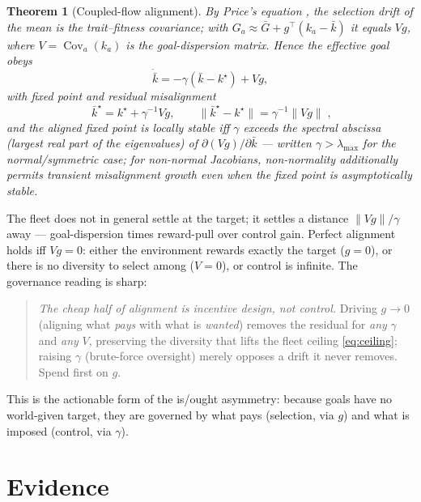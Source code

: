 \documentclass[11pt]{article}
\theoremstyle{plain}
\newtheorem{theorem}{Theorem}
\theoremstyle{definition}
\theoremstyle{remark}
\DeclareMathOperator{\Cov}{Cov}
\begin{document}
\begin{theorem}[Coupled-flow alignment]\label{thm:align}
By Price's equation \citep{price1970}, the selection drift of the mean is the trait--fitness covariance; with
$G_a\approx \bar G+g^\top(k_a-\bar k)$ it equals $Vg$, where $V=\Cov_a(k_a)$ is the goal-dispersion matrix.
Hence the effective goal obeys
\begin{equation}
\dot{\bar k}=-\gamma(\bar k-k^\star)+Vg,
\end{equation}
with fixed point and residual misalignment
\begin{equation}
\boxed{\;\bar k^\star=k^\star+\gamma^{-1}Vg,\qquad \|\bar k^\star-k^\star\|=\gamma^{-1}\|Vg\|\;,}
\end{equation}
and the aligned fixed point is locally stable iff $\gamma$ exceeds the spectral abscissa (largest real part of
the eigenvalues) of $\partial(Vg)/\partial\bar k$ --- written $\gamma>\lambda_{\max}$ for the normal/symmetric
case; for non-normal Jacobians, non-normality additionally permits transient misalignment growth even when the
fixed point is asymptotically stable.
\end{theorem}
\noindent The fleet does not in general settle at the target; it settles a distance $\|Vg\|/\gamma$ away ---
goal-dispersion times reward-pull over control gain. Perfect alignment holds iff $Vg=0$: either the environment
rewards exactly the target ($g=0$), or there is no diversity to select among ($V=0$), or control is infinite.
The governance reading is sharp:
\begin{quote}
\emph{The cheap half of alignment is incentive design, not control.} Driving $g\to0$ (aligning what \emph{pays}
with what is \emph{wanted}) removes the residual for \emph{any} $\gamma$ and \emph{any} $V$, preserving the
diversity that lifts the fleet ceiling \eqref{eq:ceiling}; raising $\gamma$ (brute-force oversight) merely
opposes a drift it never removes. Spend first on $g$.
\end{quote}
This is the actionable form of the is/ought asymmetry: because goals have no world-given target, they are
governed by what pays (selection, via $g$) and what is imposed (control, via $\gamma$).

\part{Evidence}\label{part:experiments}
\end{document}
